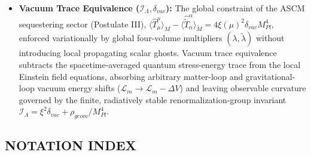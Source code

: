 \documentclass[aps,prd,onecolumn,superscriptaddress,nofootinbib,longbibliography,10pt]{revtex4-2}
\begin{document}
\begin{itemize}
\item \textbf{Vacuum Trace Equivalence (\(\mathcal{I}_\Lambda, \delta_{vac}\)):} The global constraint of the ASCM sequestering sector (Postulate III), \(\langle \hat{T}^\mu_\mu \rangle_M - \langle \hat{\tilde{T}}^\alpha_\alpha \rangle_{\tilde{M}} = 4\xi(\mu)^2\delta_{vac}M_{Pl}^4\), enforced variationally by global four-volume multipliers \((\lambda, \tilde{\lambda})\) without introducing local propagating scalar ghosts. Vacuum trace equivalence subtracts the spacetime-averaged quantum stress-energy trace from the local Einstein field equations, absorbing arbitrary matter-loop and gravitational-loop vacuum energy shifts (\(\mathcal{L}_m \to \mathcal{L}_m - \Delta V\)) and leaving observable curvature governed by the finite, radiatively stable renormalization-group invariant \(\mathcal{I}_\Lambda = \xi^2\delta_{vac} + \rho_{geom}/M_{Pl}^4\).
  
\end{itemize}

  
  
\subsection*{NOTATION INDEX}
\end{document}
